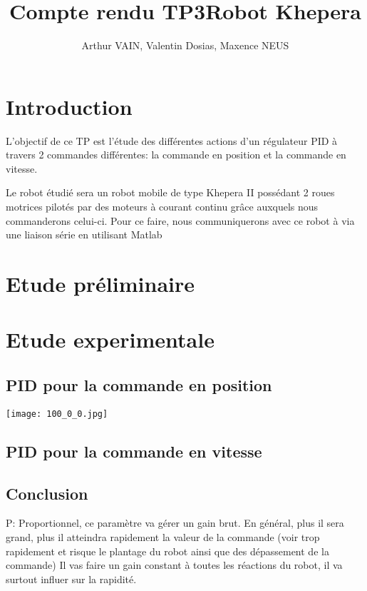 \documentclass[a4paper]{article}
\begin{document}
	\title{\large{\textbf{Compte rendu TP3}}}
	\title{\textbf{Robot Khepera}}
	\author{Arthur VAIN, Valentin Dosias, Maxence NEUS}
	\date{}
	
	\maketitle
	\newpage
	
	\tableofcontents
	\newpage
	
	\section{Introduction}
	L'objectif de ce TP est l'étude des différentes actions d'un régulateur PID à travers 2 commandes différentes: la commande en position et la commande en vitesse.
	
	Le robot étudié sera un robot mobile de type Khepera II possédant 2 roues motrices pilotés par des moteurs à courant continu grâce auxquels nous commanderons celui-ci.
	Pour ce faire, nous communiquerons avec ce robot à via une liaison série en utilisant Matlab 
	
	\section{Etude préliminaire}
	
	\section{Etude experimentale}
	\subsection{PID pour la commande en position}
	
	\texttt{[image: 100\_0\_0.jpg]}
	
	\subsection{PID pour la commande en vitesse}
	\subsection{Conclusion}
	P: Proportionnel, ce paramètre va gérer un gain brut. En général, plus il sera grand, plus il atteindra rapidement
	la valeur de la commande (voir trop rapidement et risque le plantage du robot ainsi que des dépassement de la commande)
	Il vas faire un gain constant à toutes les réactions du robot, il va surtout influer sur la rapidité.
		
\end{document}
